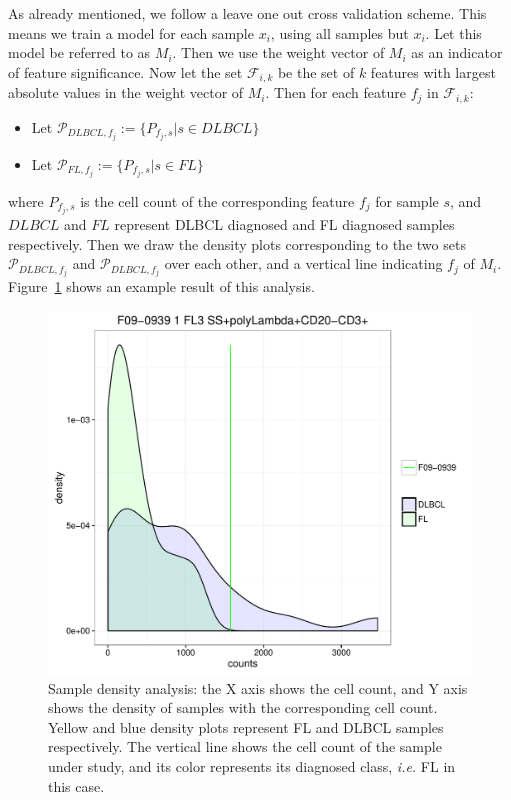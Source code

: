 As already mentioned, we follow a leave one out cross validation scheme. This means we train a model for each sample $x_i$, using all samples but $x_i$. Let this model be referred to as $M_i$. Then we use the weight vector of $M_i$ as an indicator of feature significance. Now let the set $\mathcal{F}_{i,k}$ be the set of $k$ features with largest absolute values in the weight vector of $M_i$. Then for each feature $f_j$ in $\mathcal{F}_{i,k}$:
\begin{itemize}
\item Let $\mathcal{P}_{DLBCL, f_j} := \{P_{f_j, s} | s \in DLBCL\}$
\item Let $\mathcal{P}_{FL, f_j} := \{P_{f_j, s} | s \in FL\}$
\end{itemize}

where $P_{f_j, s}$ is the cell count of the corresponding feature $f_j$ for sample $s$, and $DLBCL$ and $FL$ represent DLBCL diagnosed and FL diagnosed samples respectively. Then we draw the density plots corresponding to the two sets $\mathcal{P}_{DLBCL, f_j}$ and $\mathcal{P}_{DLBCL, f_j}$ over each other, and a vertical line indicating $f_j$ of $M_i$. Figure~\ref{fig:fcs-qa-sample-density} shows an example result of this analysis.

\begin{figure}[!ht]
  \centering
  \includegraphics[width=.6\textwidth]{figs/fcs-qa/density-analysis/F09-0939_tube1_0202000120_density}
  \caption{Sample density analysis: the X axis shows the cell count, and Y axis shows the density of samples with the corresponding cell count. Yellow and blue density plots represent FL and DLBCL samples respectively. The vertical line shows the cell count of the sample under study, and its color represents its diagnosed class, \emph{i.e.} FL in this case.}
  \label{fig:fcs-qa-sample-density}
\end{figure}

